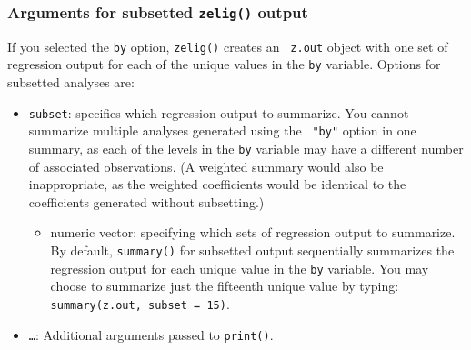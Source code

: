 \subsubsection{Arguments for subsetted {\tt zelig()} output}
If you selected the {\tt by} option, {\tt zelig()} creates an {\tt
  z.out} object with one set of regression output for each of the
unique values in the {\tt by} variable.  Options for subsetted
  analyses are:  
\begin{itemize}
\item {\tt subset}: specifies which regression output to summarize.
  You cannot summarize multiple analyses generated using the {\tt
    "by"} option in one summary, as each of the levels in the {\tt by}
  variable may have a different number of associated observations.  (A
  weighted summary would also be inappropriate, as the weighted
  coefficients would be identical to the coefficients generated
  without subsetting.)
\begin{itemize}
\item numeric vector: specifying which sets of regression output to
  summarize.  By default, {\tt summary()} for subsetted output
  sequentially summarizes the regression output for each unique value
  in the {\tt by} variable.  You may choose to summarize just the
  fifteenth unique value by typing:  {\tt summary(z.out, subset =
    15)}.  
\end{itemize}
\item {\tt \dots}: Additional arguments passed to {\tt print()}.
\end{itemize}
   
